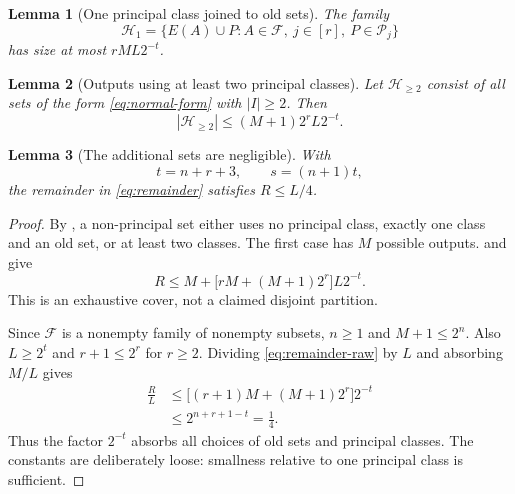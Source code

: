\documentclass[10pt,a4paper]{amsart}
\newtheorem{lemma}{Lemma}
\newcommand{\F}{\mathcal{F}}
\newcommand{\Hh}{\mathcal{H}}
\newcommand{\Pp}{\mathcal{P}}
\begin{document}
\begin{lemma}[One principal class joined to old sets]\label{lem:one-class-old}
The family
\[
 \Hh_1=\{E(A)\cup P:A\in\F,\ j\in[r],\ P\in\Pp_j\}
\]
has size at most $rML2^{-t}$.
\end{lemma}

\begin{lemma}[Outputs using at least two principal classes]\label{lem:several-classes-old}
Let $\Hh_{\ge2}$ consist of all sets of the form \eqref{eq:normal-form}
with $|I|\ge2$. Then
\begin{equation}\label{eq:several-bound}
 |\Hh_{\ge2}|\le(M+1)2^rL2^{-t}.
\end{equation}
\end{lemma}

\begin{lemma}[The additional sets are negligible]\label{lem:remainder-small}
With
\begin{equation}\label{eq:parameters}
 t=n+r+3,\qquad s=(n+1)t,
\end{equation}
the remainder in \eqref{eq:remainder} satisfies $R\le L/4$.
\end{lemma}

\begin{proof}
By , a non-principal set either uses no principal
class, exactly one class and an old set, or at least two classes. The first
case has $M$ possible outputs. 
and  give
\begin{equation}\label{eq:remainder-raw}
 R\le M+\bigl[rM+(M+1)2^r\bigr]L2^{-t}.
\end{equation}
This is an exhaustive cover, not a claimed disjoint partition.

Since $\F$ is a nonempty family of nonempty subsets, $n\ge1$ and $M+1\le2^n$.
Also $L\ge2^t$ and $r+1\le2^r$ for $r\ge2$. Dividing
\eqref{eq:remainder-raw} by $L$ and absorbing $M/L$ gives
\[
 \begin{split}
 \frac RL
 &\le\bigl[(r+1)M+(M+1)2^r\bigr]2^{-t}\\
 &\le2^{n+r+1-t}=\frac14.
 \end{split}
\]
Thus the factor $2^{-t}$ absorbs all choices of old sets and principal
classes. The constants are deliberately loose: smallness relative to one
principal class is sufficient.
\end{proof}
\end{document}

